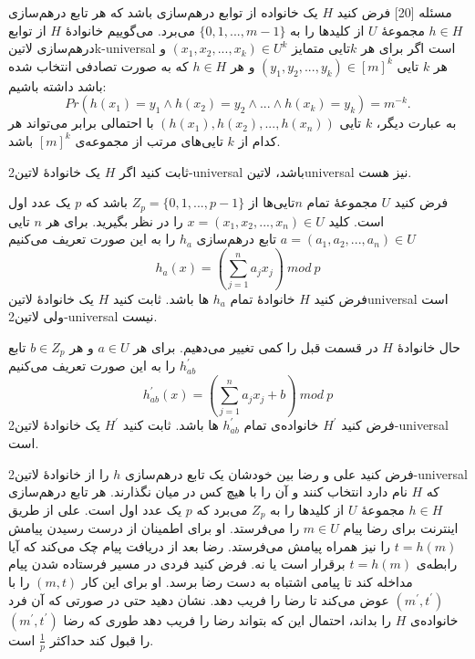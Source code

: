‌مسئله [20]
فرض کنید $H$ یک خانواده از توابع درهم‌سازی باشد که هر تابع درهم‌سازی $h \in H$ مجموعۀ $U$ از کلیدها را به $\{0, 1, ..., m-1\}$ می‌برد. می‌گوییم خانوادۀ $H$ از توابع درهم‌سازی ‌لاتین{k-universal} است اگر برای هر $k$تایی متمایز $(x_1, x_2, ..., x_k) \in U^k$ و هر $k$ تایی $(y_1, y_2, ..., y_k) \in [m]^k$ و هر $h \in H$ که به صورت تصادفی انتخاب شده باشد داشته باشیم:
$$Pr(h(x_1) = y_1 \wedge h(x_2) = y_2 \wedge ...\wedge h(x_k) = y_k) = m^{-k}.$$
به عبارت دیگر، $k$ تایی $(h(x_1), h(x_2), ..., h(x_n))$ با احتمالی برابر می‌تواند هر کدام از $k$ تایی‌های مرتب از مجموعه‌ی $[m]^k$ باشد.


 ثابت کنید اگر $H$ یک خانوادۀ ‌لاتین{2-universal} باشد، ‌لاتین{universal} نیز هست.

 فرض کنید $U$ مجموعۀ تمام $n$تایی‌ها از $Z_p = \{0, 1, ..., p-1\}$ باشد که $p$ یک عدد اول است. کلید $x = (x_1, x_2, ..., x_n) \in U$ را در نظر بگیرید. برای هر $n$ تایی $a = (a_1, a_2, ..., a_n) \in U$ تابع درهم‌سازی $h_a$ را به این صورت تعریف می‌کنیم
$$h_a(x) = (\sum_{j=1}^{n} a_jx_j)\: mod\: p$$
فرض کنید $H$ خانوادۀ تمام $h_a$ ها باشد. ثابت کنید $H$ یک خانوادۀ ‌لاتین{universal} است ولی ‌لاتین{2-universal} نیست.

 حال خانوادۀ $H$ در قسمت قبل را کمی تغییر می‌دهیم. برای هر $a \in U$ و هر $b \in Z_p$ تابع $h^\prime_{ab}$ را به این صورت تعریف می‌کنیم
$$h^\prime_{ab}(x) = (\sum_{j = 1}^{n} a_jx_j + b)\: mod\: p$$
فرض کنید $H^\prime$ خانواده‌ی تمام $h^\prime_{ab}$ ها باشد. ثابت کنید $H^\prime$ یک خانوادۀ ‌لاتین{2-universal} است.

 فرض کنید علی و رضا بین خودشان یک تابع درهم‌سازی $h$ را از خانوادۀ ‌لاتین{2-universal} که
	$H$ 
	نام دارد
	انتخاب کنند و آن را با هیچ کس در میان نگذارند. هر تابع درهم‌سازی $h \in H$ مجموعۀ $U$ از کلیدها را به $Z_p$ می‌برد که $p$ یک عدد اول است. علی از طریق اینترنت برای رضا پیام $m \in U$ را می‌فرستد. او برای اطمینان از درست رسیدن پیامش $t = h(m)$ را نیز همراه پیامش می‌فرستد. رضا بعد از دریافت پیام چک می‌کند که آیا رابطه‌ی $t = h(m)$ برقرار است یا نه. فرض کنید فردی در مسیر فرستاده شدن پیام مداخله کند تا پیامی اشتباه به دست رضا برسد. او برای این کار $(m, t)$ را با $(m^\prime, t^\prime)$ عوض می‌کند تا رضا را فریب دهد. نشان دهید حتی در صورتی که آن فرد خانواده‌ی $H$ را بداند، احتمال این که بتواند رضا را فریب دهد طوری که رضا $(m^\prime, t^\prime)$ را قبول کند حداکثر $\frac{1}{p}$ است.




